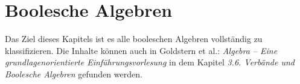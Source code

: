 \chapter{Boolesche Algebren}

Das Ziel dieses Kapitels ist es alle booleschen Algebren vollständig zu klassifizieren. Die Inhalte können auch in Goldstern et al.: \textit{Algebra -- Eine grundlagenorientierte Einführungsvorlesung} in dem Kapitel \textit{3.6. Verbände und Boolesche Algebren} gefunden werden.


